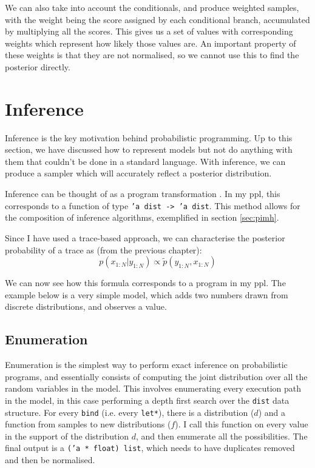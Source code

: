 We can also take into account the conditionals, and produce weighted samples, with the weight being the score assigned by each conditional branch, accumulated by multiplying all the scores. This gives us a set of values with corresponding weights which represent how likely those values are. An important property of these weights is that they are not normalised, so we cannot use this to find the posterior directly.

\section{Inference} \label{sec:inference}

Inference is the key motivation behind probabilistic programming. Up to this section, we have discussed how to represent models but not do anything with them that couldn't be done in a standard language. With inference, we can produce a sampler which will accurately reflect a posterior distribution.

Inference can be thought of as a program transformation \cite{scibior2015practical} \cite{Zinkov2016ComposingIA}. In my ppl, this corresponds to a function of type \texttt{'a dist -> 'a dist}. This method allows for the composition of inference algorithms, exemplified in section \ref{sec:pimh}.

Since I have used a trace-based approach, we can characterise the posterior probability of a trace as (from the previous chapter):
$$p(x_{1:N}|y_{1:N})\propto\tilde{p}(y_{1:N},x_{1:N})$$

We can now see how this formula corresponds to a program in my ppl. The example below is a very simple model, which adds two numbers drawn from discrete distributions, and observes a value.


\subsection{Enumeration} \label{sec:enum}
Enumeration is the simplest way to perform exact inference on probabilistic programs, and essentially consists of computing the joint distribution over all the random variables in the model. This involves enumerating every execution path in the model, in this case performing a depth first search over the \texttt{dist} data structure. For every \texttt{bind} (i.e. every \texttt{let*}), there is a distribution ($d$) and a function from samples to new distributions ($f$). I call this function on every value in the support of the distribution $d$, and then enumerate all the possibilities. The final output is a \texttt{('a * float) list}, which needs to have duplicates removed and then be normalised.

